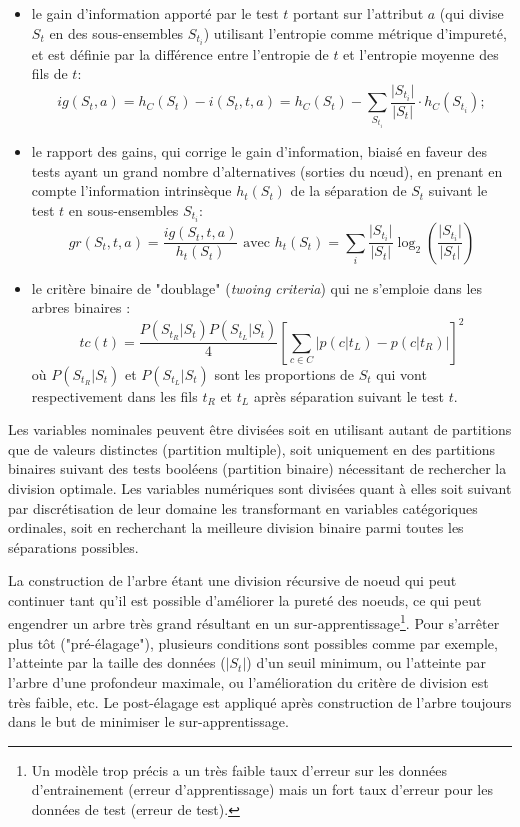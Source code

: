 \begin{itemize}
	\item le gain d'information apporté par le test $t$ portant sur l'attribut $a$ (qui divise $S_t$ en des sous-ensembles $S_{t_i}$) utilisant l'entropie comme métrique d'impureté, et est définie par la différence entre l'entropie de $t$ et l'entropie moyenne des fils de $t$:  \[ig(S_t, a) = h_C(S_t) - i(S_t, t, a) =  h_C(S_t) - \sum\limits_{S_{t_i}} \frac{\vert S_{t_i} \vert}{\vert S_{t} \vert} \cdot h_C(S_{t_i});\]
	\item le rapport des gains, qui corrige le gain d'information, biaisé en faveur des tests ayant un grand nombre d'alternatives (sorties du nœud), en prenant en compte l'information intrinsèque $h_t(S_t)$ de la séparation de $S_t$ suivant le test $t$ en sous-ensembles $S_{t_i}$: \[gr(S_t, t, a) = \frac{ig(S_t, t, a)}{h_t(S_t)} \text{ avec } h_t(S_t) = \sum\limits_i \frac{\vert S_{t_i}\vert}{\vert S_t \vert} \log_2 \left(\frac{\vert S_{t_i}\vert}{\vert S_t \vert}\right)\]
	\item le critère binaire de "doublage" (\textit{twoing criteria}) qui ne s'emploie dans les arbres binaires : \[tc(t) = \frac{P(S_{t_R} \vert S_t)P(S_{t_L} \vert S_t)}{4} \left[\sum\limits_{c \in C} \vert p(c \vert t_L) - p(c \vert t_R)\vert\right]^2\] où  $P(S_{t_R} \vert S_t)$ et $P(S_{t_L} \vert S_t)$ sont les proportions de $S_t$ qui vont respectivement dans les fils $t_R$ et $t_L$ après séparation suivant le test $t$.
\end{itemize}

Les variables nominales peuvent être divisées soit en utilisant autant de partitions que de valeurs distinctes (partition multiple), soit uniquement en des partitions binaires suivant des tests booléens (partition binaire) nécessitant de rechercher la division optimale. Les variables numériques sont divisées quant à elles soit suivant par discrétisation de leur domaine les transformant en variables catégoriques ordinales, soit en recherchant la meilleure division binaire parmi  toutes les séparations possibles. 

La construction de l'arbre étant une division récursive de noeud qui peut continuer tant qu'il est possible d'améliorer la pureté des noeuds, ce qui peut engendrer un arbre très grand résultant en un sur-apprentissage\footnote{Un modèle trop précis a un très faible taux d'erreur sur les données d'entrainement (erreur d'apprentissage) mais un fort taux d'erreur pour les données de test (erreur de test).}. Pour s'arrêter plus tôt ("pré-élagage"), plusieurs conditions sont possibles comme par exemple, l'atteinte par la taille des données ($\vert S_t \vert$) d'un seuil minimum, ou l'atteinte par l'arbre d'une profondeur maximale, ou l'amélioration du critère de division est très faible, etc. Le post-élagage est appliqué après construction de l'arbre toujours dans le but de minimiser le sur-apprentissage.

